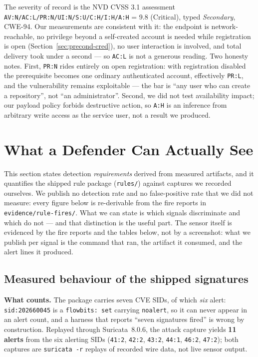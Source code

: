 The severity of record is the NVD CVSS 3.1 assessment
\texttt{AV:N/AC:L/PR:N/UI:N/S:U/C:H/I:H/A:H} = 9.8 (Critical), typed
\emph{Secondary}, CWE-94. Our measurements are consistent with it: the endpoint
is network-reachable, no privilege beyond a self-created account is needed while
registration is open (Section~\ref{sec:precond-cred}), no user interaction is
involved, and total delivery took under a second --- so \texttt{AC:L} is not a
generous reading. Two honesty notes. First, \texttt{PR:N} rides entirely on open
registration: with registration disabled the prerequisite becomes one ordinary
authenticated account, effectively \texttt{PR:L}, and the vulnerability remains
exploitable --- the bar is ``any user who can create a repository'', not ``an
administrator''. Second, we did not test availability impact; our payload policy
forbids destructive action, so \texttt{A:H} is an inference from arbitrary write
access as the service user, not a result we produced.

\section{What a Defender Can Actually See}
\label{sec:detect}

This section states detection \emph{requirements} derived from measured
artifacts, and it quantifies the shipped rule package (\texttt{rules/}) against
captures we recorded ourselves. We publish no detection rate and no false-positive
rate that we did not measure: every figure below is re-derivable from the fire
reports in \texttt{evidence/rule-fires/}. What we can state is which signals
discriminate and which do not --- and that distinction is the useful part.
The sensor itself is evidenced by the fire reports and the tables below, not by
a screenshot: what we publish per signal is the command that ran, the artifact
it consumed, and the alert lines it produced.

\subsection{Measured behaviour of the shipped signatures}

\textbf{What counts.} The package carries seven CVE SIDs, of which \emph{six}
alert: \texttt{sid:202660045} is a \texttt{flowbits:\,set} carrying
\texttt{noalert}, so it can never appear in an alert count, and a harness that
reports ``seven signatures fired'' is wrong by construction. Replayed through
Suricata~8.0.6, the attack capture yields \textbf{11 alerts} from the six
alerting SIDs (\texttt{41:2}, \texttt{42:2}, \texttt{43:2}, \texttt{44:1},
\texttt{46:2}, \texttt{47:2}); both captures are \texttt{suricata -r} replays of
recorded wire data, not live sensor output.

